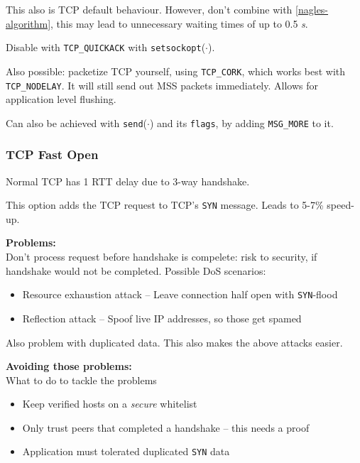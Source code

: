 \documentclass[english]{panikzettel}
\newcommand{\fkt}[1]{\texttt{#1}(\(\cdot\))}
\begin{document}
	This also is TCP default behaviour.
	However, don't combine with \cref{nagles-algorithm}, this may lead to unnecessary waiting times of up to 0.5 \textit{s}. 
	
	Disable with \texttt{TCP\_QUICKACK} with \fkt{setsockopt}.

	Also possible: packetize TCP yourself, using \texttt{TCP\_CORK}, which works best with \texttt{TCP\_NODELAY}.
	It will still send out MSS packets immediately.
	Allows for application level flushing.

	Can also be achieved with \fkt{send} and its \texttt{flags}, by adding \texttt{MSG\_MORE} to it.

	\subsubsection{TCP Fast Open}
	\label{tcp-fast-open}
	
	Normal TCP has 1 RTT delay due to 3-way handshake.

	This option adds the TCP request to TCP's \texttt{SYN} message.
	Leads to 5-7\% speed-up. 

	\textbf{Problems:}\\
	Don't process request before handshake is compelete: risk to security, if handshake would not be completed. Possible DoS scenarios:
	\begin{itemize}
		\item Resource exhaustion attack – Leave connection half open with \texttt{SYN}-flood	
		\item Reflection attack – Spoof live IP addresses, so those get spamed
	\end{itemize}
	Also problem with duplicated data. This also makes the above attacks easier.

	\textbf{Avoiding those problems:}\\
	What to do to tackle the problems
	\begin{itemize}
		\item Keep verified hosts on a \textit{secure} whitelist
		\item Only trust peers that completed a handshake – this needs a proof
		\item Application must tolerated duplicated \texttt{SYN} data
	\end{itemize}
\end{document}
